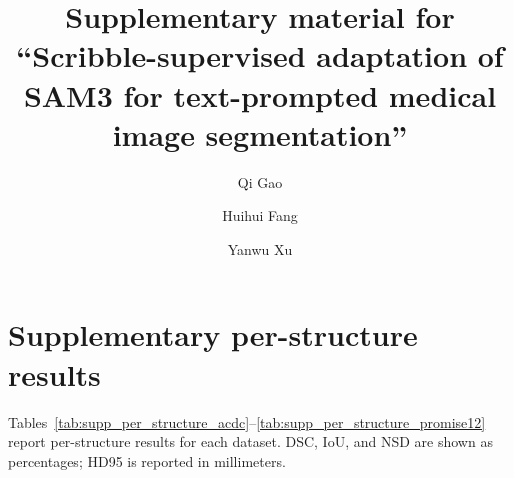 \documentclass[preprint,12pt]{elsarticle}
\begin{document}
\begin{frontmatter}

\title{Supplementary material for ``Scribble-supervised adaptation of SAM3 for text-prompted medical image segmentation''}

\author[inst1,inst2]{Qi Gao}
\author[inst1,inst2]{Huihui Fang}
\author[inst1,inst2]{Yanwu Xu}



\end{frontmatter}

\renewcommand{\thetable}{S\arabic{table}}

\section*{Supplementary per-structure results}
Tables~\ref{tab:supp_per_structure_acdc}--\ref{tab:supp_per_structure_promise12} report per-structure results for each dataset. DSC, IoU, and NSD are shown as percentages; HD95 is reported in millimeters.
\end{document}

